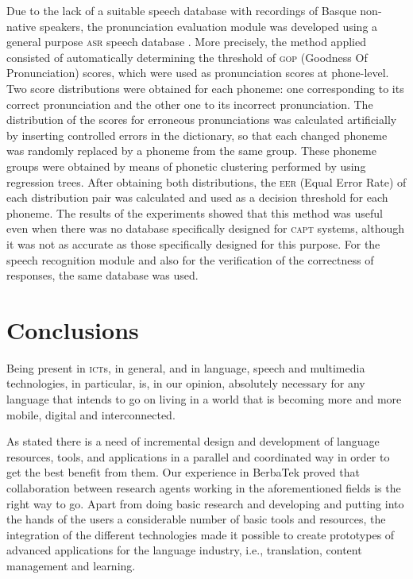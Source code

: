\documentclass[output=paper]{LSP/langsci}
\begin{document}
Due to the lack of a suitable speech database with recordings of Basque non-native speakers, the pronunciation evaluation module was developed using a general purpose \textsc{asr} speech database \citep{OdriozolaEtAl2012}. More precisely, the method applied consisted of automatically determining the threshold of \textsc{gop} (Goodness Of Pronunciation) scores, which were used as pronunciation scores at phone-level. Two score distributions were obtained for each phoneme: one corresponding to its correct pronunciation and the other one to its incorrect pronunciation. The distribution of the scores for erroneous pronunciations was calculated artificially by inserting controlled errors in the dictionary, so that each changed phoneme was randomly replaced by a phoneme from the same group. These phoneme groups were obtained by means of phonetic clustering performed by using regression trees. After obtaining both distributions, the \textsc{eer} (Equal Error Rate) of each distribution pair was calculated and used as a decision threshold for each phoneme. The results of the experiments showed that this method was useful even when there was no database specifically designed for \textsc{capt} systems, although it was not as accurate as those specifically designed for this purpose. For the speech recognition module and also for the verification of the correctness of responses, the same database was used.

\section{Conclusions}\label{sec:leturia:6}

Being present in \textsc{ict}s, in general, and in language, speech and multimedia technologies, in particular, is, in our opinion, absolutely necessary for any language that intends to go on living in a world that is becoming more and more mobile, digital and interconnected.

As \citet{AlegriaEtAl2011} stated there is a need of incremental design and development of language resources, tools, and applications in a parallel and coordinated way in order to get the best benefit from them. Our experience in BerbaTek proved that collaboration between research agents working in the aforementioned fields is the right way to go. Apart from doing basic research and developing and putting into the hands of the users a considerable number of basic tools and resources, the integration of the different technologies made it possible to create prototypes of advanced applications for the language industry, i.e., translation, content management and learning. 
\end{document}
